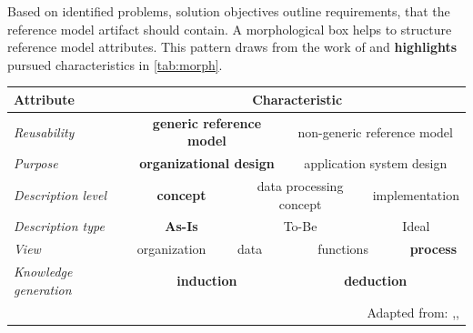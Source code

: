Based on identified problems, solution objectives outline requirements, that the reference model artifact should contain. A morphological box helps to structure reference model attributes. This pattern draws from the work of \cite{Puster2015} and \textbf{highlights} pursued characteristics in \Tab \ref{tab:morph}.  

\begin{table}[caption={Reference model requirements }, label=tab:morph]
	\centering
		\begin{tabular}{ 
				p{3.1cm}  
			p{2cm} p{2cm} p{2cm} p{2cm} p{2cm} p{2cm} p{2cm} p{2cm} p{2cm} p{2cm} p{2cm} p{2cm}    }
			Attribute                                   & \multicolumn{12}{c}{ Characteristic }                                                                                                                  \\ \hline
			\multicolumn{1}{|l|}{\textit{Reusability}}          & \multicolumn{6}{c|}{\textbf{generic reference model}}                       & \multicolumn{6}{c|}{non-generic reference model}                  \\ \hline
			\multicolumn{1}{|l|}{\textit{Purpose}}              & \multicolumn{6}{c|}{\textbf{organizational design}}                         & \multicolumn{6}{c|}{application system design}                    \\ \hline
			\multicolumn{1}{|l|}{\textit{Description level}}    & \multicolumn{4}{c|}{\textbf{concept}}                & \multicolumn{4}{c|}{data processing concept} & \multicolumn{4}{c|}{implementation}       \\ \hline
			\multicolumn{1}{|l|}{\textit{Description type}}     & \multicolumn{4}{c|}{\textbf{As-Is}}                  & \multicolumn{4}{c|}{To-Be}                   & \multicolumn{4}{c|}{Ideal}                \\ \hline
			\multicolumn{1}{|l|}{\textit{View}}                 & \multicolumn{3}{c|}{organization} & \multicolumn{3}{c|}{data}    & \multicolumn{3}{c|}{functions}   & \multicolumn{3}{c|}{\textbf{process}} \\ \hline
			\multicolumn{1}{|l|}{\textit{Knowledge generation}} & \multicolumn{6}{c|}{\textbf{induction}}                                     & \multicolumn{6}{c|}{\textbf{deduction}}                                    \\ \hline 
			\multicolumn{13}{r}{Adapted from: \citep[\p{63}]{Puster2015},\citep[\p{98}]{brocke2003referenzmodellierung}, \citep[\p{248}]{thomas2006mang}  }       
			
	\end{tabular}
\end{table}

